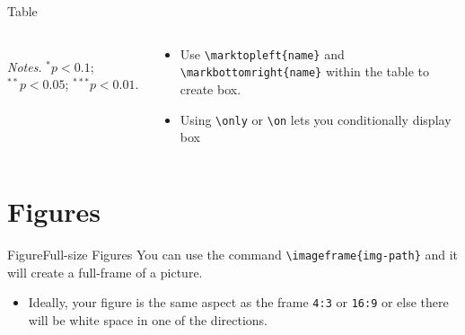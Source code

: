 \documentclass[aspectratio=169,t]{beamer}
\begin{document}
\begin{frame}{Table}
\begin{columns}[T]
\begin{column}{.6\textwidth}
\begin{table}[!htbp]
\begin{adjustbox}{max width = \textwidth, width = 0.8 \textwidth, center}
\begin{threeparttable}
\begin{tabular}{@{} l *{2}{r} @{}}
                \end{tabular} 
                \begin{tablenotes}
                    \item \textit{Notes.} $^{*} p<0.1$; $^{**} p<0.05$; $^{***} p<0.01$.
                \end{tablenotes}
            \end{threeparttable}
        \end{adjustbox}
      \end{table}
    \end{column}
    \hfill
    \begin{column}{.4\textwidth}
        \begin{itemize}
            \item Use \texttt{\textbackslash marktopleft\{name\}} and \texttt{\textbackslash markbottomright\{name\}} within the table to create box.
            \item Using \texttt{\textbackslash only} or \texttt{\textbackslash on} lets you conditionally display box
        \end{itemize}
    \end{column}
  \end{columns}
\end{frame}

\section{Figures}


\begin{frame}{Figure}{Full-size Figures}
  You can use the command \texttt{\textbackslash imageframe\{img-path\}} and it will create a full-frame of a picture. 
  
  \begin{itemize}
    \item Ideally, your figure is the same aspect as the frame \texttt{4:3} or \texttt{16:9} or else there will be white space in one of the directions.
  \end{itemize}
\end{frame}
\end{document}
